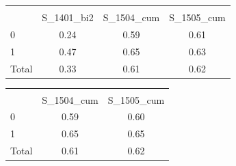 \begin{table}
  \centering
\begin{tabular}{l*{1}{ccc}}
\hline\hline
                    &\multicolumn{3}{c}{}                  \\
                    &  S\_1401\_bi2&  S\_1504\_cum&  S\_1505\_cum\\
\hline
0                   &        0.24&        0.59&        0.61\\
1                   &        0.47&        0.65&        0.63\\
Total               &        0.33&        0.61&        0.62\\
\hline\hline
\end{tabular}
\end{table}

\begin{table} 
  \centering
\begin{tabular}{l*{1}{cc}}
\hline\hline
                    &\multicolumn{2}{c}{}     \\
                    &  S\_1504\_cum&  S\_1505\_cum\\
\hline
0                   &        0.59&        0.60\\
1                   &        0.65&        0.65\\
Total               &        0.61&        0.62\\
\hline\hline
\end{tabular}
\end{table}
\\
